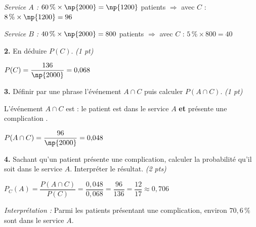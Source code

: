 \documentclass[11pt,a4paper]{article}
\newcommand{\sol}[1]{\textcolor{solcolor}{#1}}
\begin{document}
\smallskip
\sol{\textit{Service $A$ :} $60\,\%\times\np{2000}=\np{1200}$ patients $\Rightarrow$ avec $C$ : $8\,\%\times\np{1200}=96$}

\sol{\textit{Service $B$ :} $40\,\%\times\np{2000}=800$ patients $\Rightarrow$ avec $C$ : $5\,\%\times 800=40$}

\vspace{4mm}

\textbf{2.} En déduire $P(C)$. \hfill\textit{(1 pt)}

\medskip
\sol{$P(C) = \dfrac{136}{\np{2000}} = 0{,}068$}

\vspace{4mm}

\textbf{3.} Définir par une phrase l'événement $A \cap C$ puis calculer $P(A \cap C)$. \hfill\textit{(1 pt)}

\medskip
\sol{L'événement $A \cap C$ est : \og le patient est dans le service $A$ \textbf{et} présente une complication \fg.}

\sol{$P(A \cap C) = \dfrac{96}{\np{2000}} = 0{,}048$}

\vspace{4mm}

\textbf{4.} Sachant qu'un patient présente une complication, calculer la probabilité qu'il soit dans le service $A$.
Interpréter le résultat. \hfill\textit{(2 pts)}

\medskip
\sol{$P_C(A) = \dfrac{P(A \cap C)}{P(C)} = \dfrac{0{,}048}{0{,}068} = \dfrac{96}{136} = \dfrac{12}{17} \approx 0{,}706$}

\smallskip
\sol{\textit{Interprétation :} Parmi les patients présentant une complication, environ $70{,}6\,\%$ sont dans le service $A$.}
\end{document}
